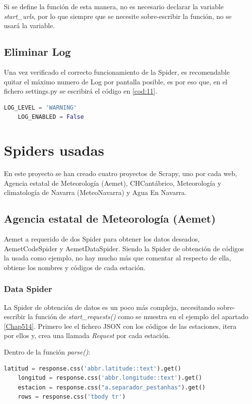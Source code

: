 Si se define la función de esta manera, no es necesario declarar la variable \textit{start\_urls}, por lo que siempre que se necesite sobre-escribir la función, no se usará la variable.

\subsection{Eliminar Log}
Una vez verificado el correcto funcionamiento de la Spider, es recomendable quitar el máximo numero de Log por pantalla posible, es por eso que, en el fichero settings.py se escribirá el código en \ref{cod:11}.

\begin{lstlisting}[language=Python, caption={Configurar desactivado del LOG de las Spider}, label=cod:11]
	LOG_LEVEL = 'WARNING'
	LOG_ENABLED = False
\end{lstlisting}

\section{Spiders usadas}
En este proyecto se han creado cuatro proyectos de Scrapy, uno por cada web, Agencia estatal de Meteorología (Aemet), CHCantábrico, Meteorología y climatología de Navarra (MeteoNavarra) y Agua En Navarra.

\subsection{Agencia estatal de Meteorología (Aemet)}
Aemet a requerido de dos Spider para obtener los datos deseados, AemetCodeSpider y AemetDataSpider. Siendo la Spider de obtención de códigos la usada como ejemplo, no hay mucho más que comentar al respecto de ella, obtiene los nombres y códigos de cada estación.

\subsubsection{Data Spider}
La Spider de obtención de datos es un poco más compleja, necesitando sobre-escribir la función de \textit{start\_requests()} como se muestra en el ejemplo del apartado \ref{Chap514}. Primero lee el fichero JSON con los códigos de las estaciones, itera por ellos y, crea una llamada \textit{Request} por cada estación.

Dentro de la función \textit{parse()}:

\begin{lstlisting}[language=Python, caption={Selector en \textit{parse()} de Aemet Data Spider}, label=cod:12]
	latitud = response.css('abbr.latitude::text').get()
	longitud = response.css('abbr.longitude::text').get()
	estacion = response.css("a.separador_pestanhas").get()
	rows = response.css('tbody tr')
\end{lstlisting}

